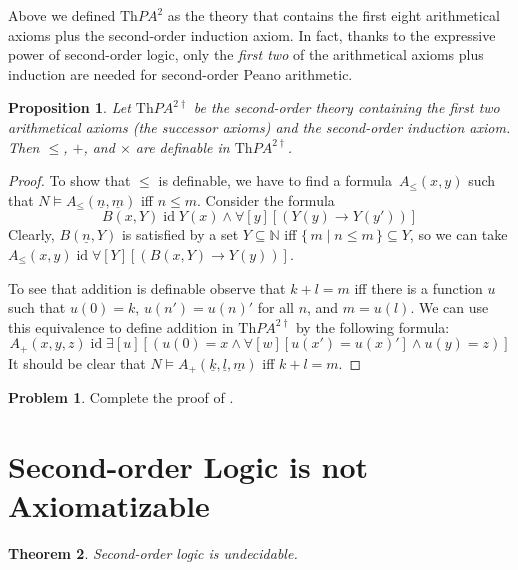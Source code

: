 \documentclass[10pt,a4paper]{article}
\makeatletter
\theoremstyle{plain}
\newtheorem{thm}{Theorem}[section]
\newtheorem{prop}[thm]{Proposition}
\theoremstyle{definition}
\newtheorem{prob}{Problem}[section]
\theoremstyle{remark}
\newcommand*{\olfileid}[3]{}
\newcommand*{\olsection}[1]{\section*{#1}}
\newcommand*{\ollabel}[1]{\label{#1}}
\newcommand{\olref}{\@ifnextchar[{\olref@i}{\olref@final}}
\def\olref@i[#1]{\@ifnextchar[{\olref@ii}{\olref@final}}
\def\olref@ii[#1]{\@ifnextchar[{\olref@iii}{\olref@final}}
\def\olref@iii[#1]{\olref@final}
\def\olref@final#1{\ref{#1}}
\providecommand{\lif}{\mathbin{\rightarrow}}
\providecommand{\lforall}{\mathord{\forall}}
\providecommand{\lexists}{\mathord{\exists}}
\providecommand{\Obj}{}
\providecommand{\Sat}[2]{\ensuremath{#1 \models #2}}
\providecommand{\Th}{\ensuremath{\mathrm{Th}}}
\providecommand{\num}[1]{\underline{#1}}
\providecommand{\Nat}{\ensuremath{\mathbb{N}}}
\providecommand{\Setabs}[2]{\{\, #1 \mid #2 \,\}}
\providecommand{\ident}{\operatorname{id}}
\makeatother
\begin{document}
Above we defined $\Th{PA^2}$ as the theory that contains the first eight 
arithmetical axioms plus the second-order induction axiom.  In fact, thanks
to the expressive power of second-order logic, only the \emph{first two} 
of the arithmetical axioms plus induction are needed for second-order Peano 
arithmetic.

\begin{prop}\ollabel{prop:sol-pa-definable}
Let $\Th{PA^{2\dagger}}$ be the second-order theory containing the
first two arithmetical axioms (the successor axioms) and the
second-order induction axiom. Then $\le$, $+$, and $\times$ are definable
in $\Th{PA^{2\dagger}}$.
\end{prop}

\begin{proof}
To show that $\le$ is definable, we have to find a formula~$A_\le(x, y)$
such that $\Sat{N}{A_\le(\num n, \num m)}$ iff $n \le m$. Consider the formula
\[
B(x, Y) \ident Y(x) \land \lforall[y][(Y(y) \lif Y(y'))]
\]
Clearly, $B(\num n, Y)$ is satisfied by a set $Y \subseteq \Nat$ iff
$\Setabs{m}{n \le m} \subseteq Y$, so we can take $A_\le(x, y) \ident
\lforall[Y][(B(x, Y) \lif Y(y))]$.

To see that addition is definable observe that $k+l=m$ iff there is a
function $u$ such that $u(0)=k$, $u(n')=u(n)'$ for all $n$, and $m = u(l)$. 
We can use this equivalence to define addition in $\Th{PA^{2\dagger}}$ 
by the following formula:
\[
A_+(x,y,z) \ident \lexists[u][(u(\Obj 0)=x \land \lforall[w][u(x')=u
 (x)'] \land u(y)=z)]
\] 
It should be clear that $\Sat{N}{A_+(\num k, \num l, \num m)}$ 
iff $k+l=m$.
\end{proof}

\begin{prob}
Complete the proof of \olref[sol][met][spa]{prop:sol-pa-definable}.
\end{prob}





\olfileid{sol}{met}{nax}

\olsection{Second-order Logic is not Axiomatizable}


\begin{thm}
\ollabel{thm:sol-undecidable}
Second-order logic is undecidable.
\end{thm}
\end{document}
